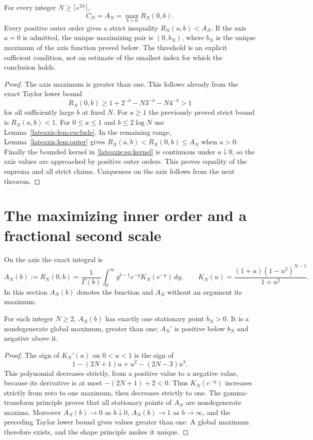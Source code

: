 \begin{theorem}
\label{lateaxis:thm:reduction}
For every integer $N\ge\lceil e^{24}\rceil$,
\[
 \boxed{\quad C_N=A_N=\max_{b>0}R_N(0,b).\quad}
\]
Every positive outer order gives a strict inequality
$R_N(a,b)<A_N$.  If the axis $a=0$ is admitted, the unique maximizing
pair is $(0,b_N)$, where $b_N$ is the unique maximum of the axis
function proved below.  The threshold is an explicit sufficient
condition, not an estimate of the smallest index for which the
conclusion holds.
\end{theorem}
\begin{proof}
The axis maximum is greater than one.  This follows already from the
exact Taylor lower bound
\[
 R_N(0,b)\ge1+2^{-b}-N3^{-b}-N4^{-b}>1
\]
for all sufficiently large $b$ at fixed $N$.
For $a\ge1$ the previously proved strict bound is $R_N(a,b)<1$.
For $0\le a\le1$ and $b\le2\log N$ use
Lemma~\ref{lateaxis:lem:exclude}.  In the remaining range,
Lemma~\ref{lateaxis:lem:outer} gives
$R_N(a,b)<R_N(0,b)\le A_N$ when $a>0$.
Finally the bounded kernel in \eqref{lateaxis:eq:kernel} is continuous
under $a\downarrow0$, so the axis values are approached by positive
outer orders.  This proves equality of the suprema and all strict
claims.  Uniqueness on the axis follows from the next theorem.
\end{proof}

\section{The maximizing inner order and a fractional second scale}
\label{lateaxis:sec:asymptotic}

On the axis the exact integral is
\[
 A_N(b):=R_N(0,b)=\frac1{\Gamma(b)}\int_0^\infty
        y^{b-1}e^{-y}K_N(e^{-y})\,dy,
 \qquad K_N(u)=\frac{(1+u)(1-u^2)^{N-1}}{1+u^2}.
\]
In this section $A_N(b)$ denotes the function and $A_N$ without an
argument its maximum.

\begin{theorem}
\label{lateaxis:thm:unique}
For each integer $N\ge2$, $A_N(b)$ has exactly one stationary point
$b_N>0$.  It is a nondegenerate global maximum, greater than one;
$A_N'$ is positive below $b_N$ and negative above it.
\end{theorem}
\begin{proof}
The sign of $K_N'(u)$ on $0<u<1$ is the sign of
\[
 1-(2N+1)u+u^2-(2N-3)u^3.
\]
This polynomial decreases strictly, from a positive value to a
negative value, because its derivative is at most $-(2N+1)+2<0$.
Thus $K_N(e^{-y})$ increases strictly from zero to one maximum,
then decreases strictly to one.  The gamma-transform principle
proves that all stationary points of $A_N$ are nondegenerate
maxima.  Moreover $A_N(b)\to0$ as $b\downarrow0$,
$A_N(b)\to1$ as $b\to\infty$, and the preceding Taylor lower
bound gives values greater than one.  A global maximum therefore
exists, and the shape principle makes it unique.
\end{proof}

